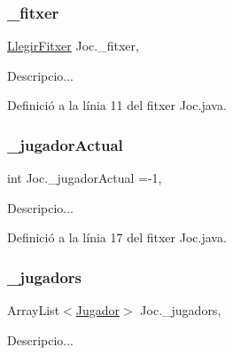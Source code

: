 \mbox{\label{class_joc_af07590c09ae2ebda3bf6ca1a4171063b}} 
\subsubsection{\texorpdfstring{\+\_\+fitxer}{\_fitxer}}
{\footnotesize\ttfamily \mbox{\hyperlink{class_llegir_fitxer}{Llegir\+Fitxer}} Joc.\+\_\+fitxer\hspace{0.3cm}{\ttfamily [static]}, {\ttfamily [private]}}



Descripcio... 



Definició a la línia 11 del fitxer Joc.\+java.

\mbox{\label{class_joc_a58dad008aa898ed0af6827ef7da50083}} 
\subsubsection{\texorpdfstring{\+\_\+jugador\+Actual}{\_jugadorActual}}
{\footnotesize\ttfamily int Joc.\+\_\+jugador\+Actual =-\/1\hspace{0.3cm}{\ttfamily [static]}, {\ttfamily [private]}}



Descripcio... 



Definició a la línia 17 del fitxer Joc.\+java.

\mbox{\label{class_joc_a30a9ea3f0be1aee222a22fede9130cb8}} 
\subsubsection{\texorpdfstring{\+\_\+jugadors}{\_jugadors}}
{\footnotesize\ttfamily Array\+List$<$\mbox{\hyperlink{class_jugador}{Jugador}}$>$ Joc.\+\_\+jugadors\hspace{0.3cm}{\ttfamily [static]}, {\ttfamily [private]}}



Descripcio... 



